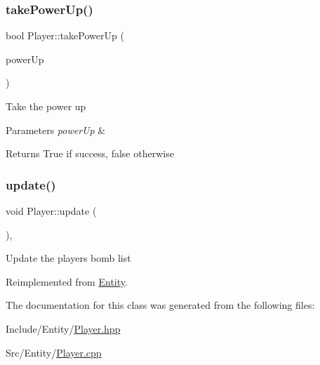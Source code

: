 \subsubsection{\texorpdfstring{takePowerUp()}{takePowerUp()}}
{\footnotesize\ttfamily bool Player\+::take\+Power\+Up (\begin{DoxyParamCaption}\item[{const \mbox{\hyperlink{class_power_up}{Power\+Up}} \&}]{power\+Up }\end{DoxyParamCaption})}

Take the power up 
\begin{DoxyParams}{Parameters}
{\em power\+Up} & \\
\hline
\end{DoxyParams}
\begin{DoxyReturn}{Returns}
True if success, false otherwise 
\end{DoxyReturn}
\mbox{\label{class_player_a6912bb6e48efb5845d59f0f4582827ef}} 
\subsubsection{\texorpdfstring{update()}{update()}}
{\footnotesize\ttfamily void Player\+::update (\begin{DoxyParamCaption}{ }\end{DoxyParamCaption})\hspace{0.3cm}{\ttfamily [override]}, {\ttfamily [virtual]}}

Update the player\textquotesingle{}s bomb list 

Reimplemented from \mbox{\hyperlink{class_entity_a00b6eeaf99b35c8f8b10b5fbfc1baf4f}{Entity}}.



The documentation for this class was generated from the following files\+:\begin{DoxyCompactItemize}
\item 
Include/\+Entity/\mbox{\hyperlink{_player_8hpp}{Player.\+hpp}}\item 
Src/\+Entity/\mbox{\hyperlink{_player_8cpp}{Player.\+cpp}}\end{DoxyCompactItemize}
